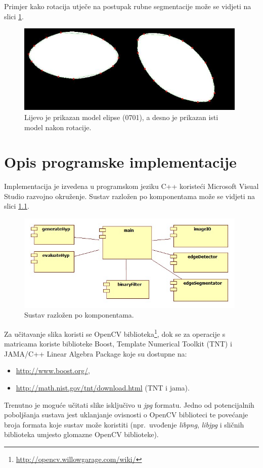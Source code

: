 \documentclass[lmodern, utf8, seminar, numeric]{fer}
\begin{document}
Primjer kako rotacija utječe na postupak rubne segmentacije može se vidjeti na
slici \ref{fig:segmenti-rotacija}.

\begin{figure}[!h]
\begin{center}
\includegraphics[width=11cm]{resources/dvije-elipse.png}
\end{center}
\caption{Lijevo je prikazan model elipse (0701), a desno je prikazan isti model nakon rotacije.} 
\label{fig:segmenti-rotacija}
\end{figure}

\chapter{Opis programske implementacije}
Implementacija je izvedena u programskom jeziku C++ koristeći Microsoft Visual
Studio razvojno okruženje. Sustav razložen po komponentama može se vidjeti na
slici \ref{fig:komponente}.

\begin{figure}[htb]
\begin{center}
\includegraphics[width=11cm]{resources/komponente.png}
\end{center}
\caption{Sustav razložen po komponentama.} 
\label{fig:komponente}
\end{figure}

Za učitavanje slika koristi se OpenCV biblioteka\footnote{\url{http://opencv.willowgarage.com/wiki/}}, dok se za operacije s
matricama koriste biblioteke Boost, Template Numerical Toolkit (TNT) i JAMA/C++
Linear Algebra Package koje su dostupne na:
\begin{itemize}
  \item \url{http://www.boost.org/},
  \item \url{http://math.nist.gov/tnt/download.html} (TNT i jama).
\end{itemize}
Trenutno je moguće učitati slike isključivo u \emph{jpg} formatu. Jedno od
potencijalnih poboljšanja sustava jest uklanjanje ovisnosti o OpenCV biblioteci
te povećanje broja formata koje sustav može koristiti (npr.\ uvođenje \emph{libpng},
\emph{libjpg} i sličnih biblioteka umjesto glomazne OpenCV biblioteke).
\end{document}
